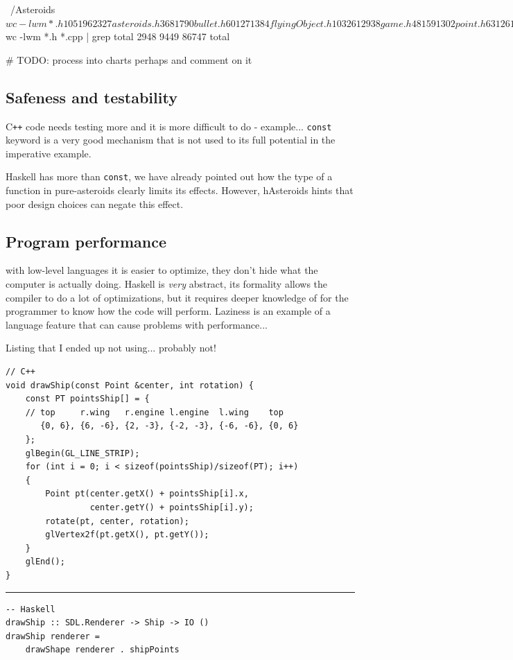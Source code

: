 \documentclass[
  digital, %
  color,   %
  table,   %
  oneside, %
  lof,     %
  lot,     %
]{fithesis3}
\newcommand{\cpp}{C\nolinebreak\texttt{+}\nolinebreak\texttt{+}}
\begin{document}
{\begin{term}
~/Asteroids$ wc -lwm *.h
  105   196  2327 asteroids.h
   36    81   790 bullet.h
   60   127  1384 flyingObject.h
  103   261  2938 game.h
   48   159  1302 point.h
   63   126  1227 ship.h
  135   580  5979 uiDraw.h
  133   644  5045 uiInteract.h
   29    62   626 velocity.h
  712  2236 21618 total

~/Asteroids$ wc -lwm *.h *.cpp | grep total
 2948  9449 86747 total
\end{term}

\# TODO: process into charts perhaps and comment on it


\subsection{Safeness and testability}
\cpp{} code needs testing more and it is more difficult to do - example...
\texttt{const} keyword is a very good mechanism that is not used to its
full potential in the imperative example.

Haskell has more than \texttt{const}, we have already pointed out how
the type of a function in pure-asteroids clearly limits its effects.
However, hAsteroids hints that poor design choices can negate this effect.

\subsection{Program performance}
with low-level languages it is easier to optimize, they don't hide
what the computer is actually doing. Haskell is \emph{very} abstract,
its formality allows the compiler to do a lot of optimizations, but
it requires deeper knowledge of  for the programmer
to know how the code will perform. Laziness is an example
of a language feature that can cause problems with performance...

Listing that I ended up not using... probably not!
\begin{listing}[hbt]
\begin{verbatim}
// C++
void drawShip(const Point &center, int rotation) {
    const PT pointsShip[] = {
    // top     r.wing   r.engine l.engine  l.wing    top
       {0, 6}, {6, -6}, {2, -3}, {-2, -3}, {-6, -6}, {0, 6}  
    };
    glBegin(GL_LINE_STRIP);
    for (int i = 0; i < sizeof(pointsShip)/sizeof(PT); i++)
    {
        Point pt(center.getX() + pointsShip[i].x, 
                 center.getY() + pointsShip[i].y);
        rotate(pt, center, rotation);
        glVertex2f(pt.getX(), pt.getY());
    }
    glEnd();
}
\end{verbatim}
\rule{\textwidth}{0.4pt}
\begin{verbatim}
-- Haskell
drawShip :: SDL.Renderer -> Ship -> IO ()
drawShip renderer =
    drawShape renderer . shipPoints


\end{verbatim}
\end{listing}}
\end{document}
